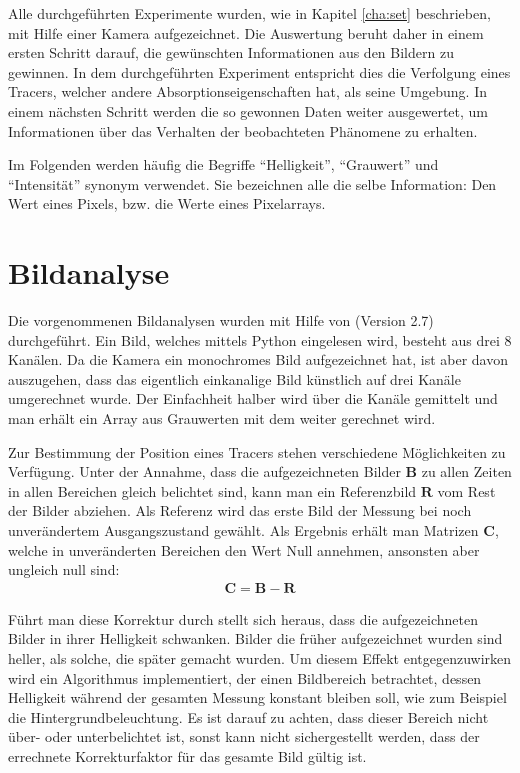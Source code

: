 \label{cha:meth}

Alle durchgeführten Experimente wurden, wie in Kapitel \ref{cha:set} beschrieben, mit Hilfe einer Kamera aufgezeichnet. Die Auswertung beruht daher in einem ersten Schritt darauf, die gewünschten Informationen aus den Bildern zu gewinnen. In dem durchgeführten Experiment entspricht dies die Verfolgung eines Tracers, welcher andere Absorptionseigenschaften hat, als seine Umgebung.
In einem nächsten Schritt werden die so gewonnen Daten weiter ausgewertet, um Informationen über das Verhalten der beobachteten Phänomene zu 
erhalten.

Im Folgenden werden häufig die Begriffe ``Helligkeit'', ``Grauwert'' und ``Intensität'' synonym verwendet. Sie bezeichnen alle die selbe Information: Den Wert eines Pixels, bzw. die Werte eines Pixelarrays.

\section{Bildanalyse}
\label{sec:ima}
Die vorgenommenen Bildanalysen wurden mit Hilfe von \cite{python} (Version 2.7) durchgeführt. 
Ein Bild, welches mittels Python eingelesen wird, besteht aus drei \SI{8}{\bit} Kanälen. Da die Kamera ein monochromes Bild aufgezeichnet hat, ist aber davon auszugehen, dass das eigentlich einkanalige Bild künstlich auf drei Kanäle umgerechnet wurde. Der Einfachheit halber wird über die Kanäle gemittelt und man erhält ein Array aus Grauwerten mit dem weiter gerechnet wird.

Zur Bestimmung der Position eines Tracers stehen verschiedene Möglichkeiten zu Verfügung.
Unter der Annahme, dass die aufgezeichneten Bilder $\mathbf{B}$ zu allen Zeiten in allen Bereichen gleich belichtet sind, kann man ein Referenzbild $\mathbf{R}$ vom Rest der Bilder abziehen. Als Referenz wird das erste Bild der Messung bei noch unverändertem Ausgangszustand gewählt. Als Ergebnis erhält man Matrizen $\mathbf{C}$, welche in unveränderten Bereichen den Wert Null annehmen, ansonsten aber ungleich null sind:
\begin{eqnarray}
 \mathbf{C} = \mathbf{B} - \mathbf{R}
\end{eqnarray}


Führt man diese Korrektur durch stellt sich heraus, dass die aufgezeichneten Bilder in ihrer Helligkeit schwanken. Bilder die früher aufgezeichnet wurden sind heller, als solche, die später gemacht wurden. Um diesem Effekt entgegenzuwirken wird ein Algorithmus implementiert, der einen Bildbereich betrachtet, dessen Helligkeit während der gesamten Messung konstant bleiben soll, wie zum Beispiel die Hintergrundbeleuchtung. Es ist darauf zu achten, dass dieser Bereich nicht über- oder unterbelichtet ist, sonst kann nicht sichergestellt werden, dass der errechnete Korrekturfaktor für das gesamte Bild gültig ist. 

